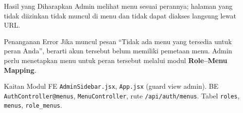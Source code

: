 \begin{flowsection}{Hasil yang Diharapkan}
Admin melihat menu sesuai perannya; halaman yang tidak diizinkan tidak muncul di
menu dan tidak dapat diakses langsung lewat URL.
\end{flowsection}

\begin{flowsection}{Penanganan Error}
Jika muncul pesan ``Tidak ada menu yang tersedia untuk peran Anda'', berarti akun
tersebut belum memiliki pemetaan menu. Admin perlu menetapkan menu untuk peran
tersebut melalui modul \textbf{Role--Menu Mapping}.
\end{flowsection}

\begin{flowsection}{Kaitan Modul}
FE \texttt{AdminSidebar.jsx}, \texttt{App.jsx} (guard view admin). BE
\texttt{AuthController@menus}, \texttt{MenuController}, rute \texttt{/api/auth/menus}.
Tabel \texttt{roles}, \texttt{menus}, \texttt{role\_menus}.
\end{flowsection}

